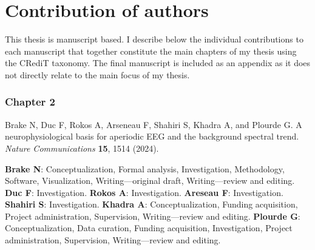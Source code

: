 \chapter*{Contribution of authors}

\setlength{\parindent}{0pt}
\setlength{\parskip}{3pt}

This thesis is manuscript based. I describe below the individual contributions to each manuscript that together constitute the main chapters of my thesis using the CRediT taxonomy. The final manuscript is included as an appendix as it does not directly relate to the main focus of my thesis.

\vspace{-.5em}
\subsection*{Chapter 2}

Brake N, Duc F, Rokos A, Arseneau F, Shahiri S, Khadra A, and Plourde G. A neurophysiological basis for aperiodic EEG and the background spectral trend. \textit{Nature Communications} \textbf{15}, 1514 (2024).

{\small \textbf{Brake N}: Conceptualization, Formal analysis, Investigation, Methodology, Software, Visualization, Writing—original draft, Writing—review and editing. \textbf{Duc F}: Investigation. \textbf{Rokos A}: Investigation. \textbf{Areseau F}: Investigation. \textbf{Shahiri S}: Investigation. \textbf{Khadra A}: Conceptualization, Funding acquisition, Project administration, Supervision, Writing—review and editing. \textbf{Plourde G}: Conceptualization, Data curation, Funding acquisition, Investigation, Project administration, Supervision, Writing—review and editing.}




